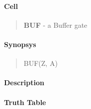 \label{BUF}
\paragraph{Cell}
\begin{quote}
    \textbf{BUF} - a Buffer gate
\end{quote}

\paragraph{Synopsys}
\begin{quote}
    BUF(Z, A)
\end{quote}

\paragraph{Description}



\paragraph{Truth Table}


